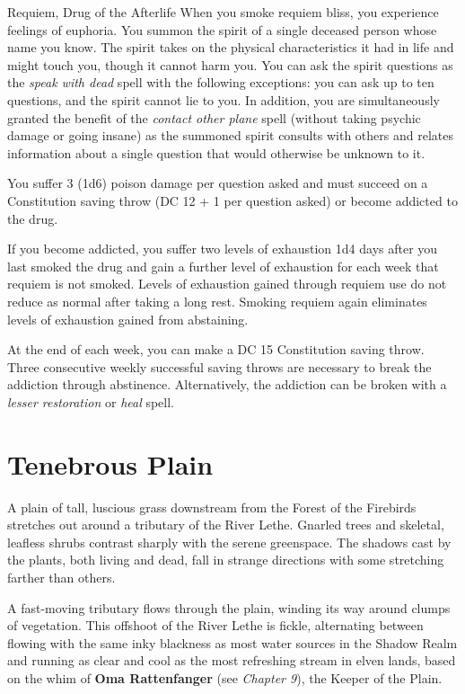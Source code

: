 \documentclass[10pt,a4paper,twoside,bg=print,twocolumn,openany,nodeprecatedcode]{dndbook}
\begin{document}
\begin{DndSidebar}[float=!b]{Requiem, Drug of the Afterlife}
When you smoke requiem bliss, you experience feelings of euphoria. You summon the spirit of a single deceased person whose name you know. The spirit takes on the physical characteristics it had in life and might touch you, though it cannot harm you. You can ask the spirit questions as the \textit{speak with dead} spell with the following exceptions: you can ask up to ten questions, and the spirit cannot lie to you. In addition, you are simultaneously granted the benefit of the \textit{contact other plane} spell (without taking psychic damage or going insane) as the summoned spirit consults with others and relates information about a single question that would otherwise be unknown to it.



You suffer 3 (1d6) poison damage per question asked and must succeed on a Constitution saving throw (DC 12 + 1 per question asked) or become addicted to the drug.



If you become addicted, you suffer two levels of exhaustion 1d4 days after you last smoked the drug and gain a further level of exhaustion for each week that requiem is not smoked. Levels of exhaustion gained through requiem use do not reduce as normal after taking a long rest. Smoking requiem again eliminates levels of exhaustion gained from abstaining.



At the end of each week, you can make a DC 15 Constitution saving throw. Three consecutive weekly successful saving throws are necessary to break the addiction through abstinence. Alternatively, the addiction can be broken with a \textit{lesser restoration} or \textit{heal} spell.



\end{DndSidebar}

\section{Tenebrous Plain}
A plain of tall, luscious grass downstream from the Forest of the Firebirds stretches out around a tributary of the River Lethe. Gnarled trees and skeletal, leafless shrubs contrast sharply with the serene greenspace. The shadows cast by the plants, both living and dead, fall in strange directions with some stretching farther than others.

A fast-moving tributary flows through the plain, winding its way around clumps of vegetation. This offshoot of the River Lethe is fickle, alternating between flowing with the same inky blackness as most water sources in the Shadow Realm and running as clear and cool as the most refreshing stream in elven lands, based on the whim of \textbf{Oma Rattenfanger} (see \textit{Chapter 9}), the Keeper of the Plain.
\end{document}
